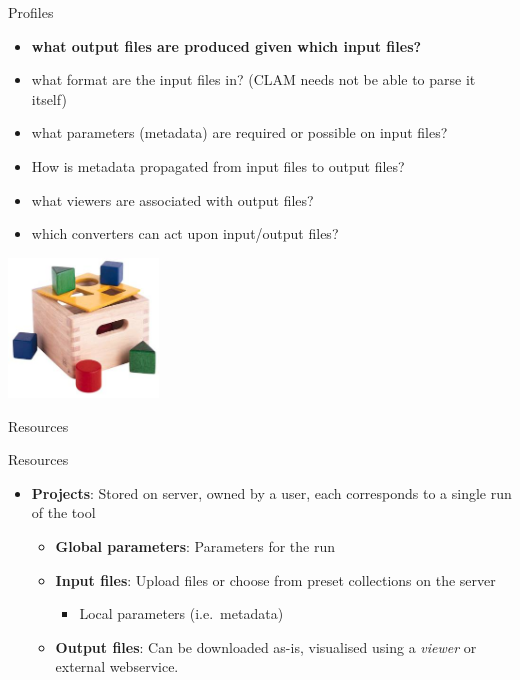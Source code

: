 \documentclass[xcolor=table,10pt,t]{beamer}
\begin{document}
\begin{frame}
    \begin{block}{Profiles}
        \begin{itemize}
            \item \textbf{what output files are produced given which input files?}
            \item what format are the input files in? (CLAM needs not be able to parse it itself)
            \item what parameters (metadata) are required or possible on input files?
            \item How is metadata propagated from input files to output files?
            \item what viewers are associated with output files?
            \item which converters can act upon input/output files?
        \end{itemize}
    \end{block}
    \includegraphics[width=40.0mm]{blokkendoos.jpg}
\end{frame}



\begin{frame}{Resources}
  \begin{block}{Resources}
      \begin{itemize}
          \item \textbf{Projects}: Stored on server, owned by a user, each corresponds to a single
              run of the tool
          \begin{itemize}
            \item \textbf{Global parameters}: Parameters for the run
            \item \textbf{Input files}: Upload files or choose from preset collections on the server
            \begin{itemize}
                \item Local parameters (i.e.\ metadata)
            \end{itemize}
            \item \textbf{Output files}: Can be downloaded as-is, visualised
                using a \emph{viewer} or external webservice.
          \end{itemize}
      \end{itemize}
  \end{block}
\end{frame}
\end{document}
